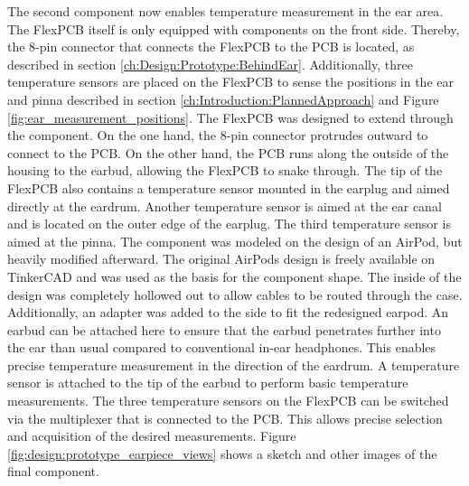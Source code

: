 The second component now enables temperature measurement in the ear area. The FlexPCB itself is only equipped with components on the front side. Thereby, the 8-pin connector that connects the FlexPCB to the PCB is located, as described in section \ref{ch:Design:Prototype:BehindEar}. Additionally, three temperature sensors are placed on the FlexPCB to sense the positions in the ear and pinna described in section \ref{ch:Introduction:PlannedApproach} and Figure \ref{fig:ear_measurement_positions}.
The FlexPCB was designed to extend through the component. On the one hand, the 8-pin connector protrudes outward to connect to the PCB. On the other hand, the PCB runs along the outside of the housing to the earbud, allowing the FlexPCB to snake through. The tip of the FlexPCB also contains a temperature sensor mounted in the earplug and aimed directly at the eardrum. Another temperature sensor is aimed at the ear canal and is located on the outer edge of the earplug. The third temperature sensor is aimed at the pinna.
The component was modeled on the design of an AirPod, but heavily modified afterward. The original AirPods design is freely available on TinkerCAD and was used as the basis for the component shape. The inside of the design was completely hollowed out to allow cables to be routed through the case. Additionally, an adapter was added to the side to fit the redesigned earpod. An earbud can be attached here to ensure that the earbud penetrates further into the ear than usual compared to conventional in-ear headphones. This enables precise temperature measurement in the direction of the eardrum. A temperature sensor is attached to the tip of the earbud to perform basic temperature measurements.
The three temperature sensors on the FlexPCB can be switched via the multiplexer that is connected to the PCB. This allows precise selection and acquisition of the desired measurements. Figure \ref{fig:design:prototype_earpiece_views} shows a sketch and other images of the final component.

